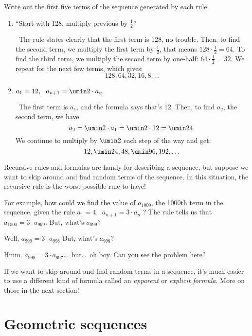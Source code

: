 \begin{boxex}
Write out the first five terms of the sequence generated by each rule.

\begin{enumerate}
\item ``Start with 128, multiply previous by $\frac{1}{2}$''

\exsoln\ The rule states clearly that the first term is 128, no trouble. Then, to find the second term, we multiply the first term by $\frac{1}{2}$, that means $128 \cdot \frac{1}{2} = 64$. To find the third term, we multiply the second term by one-half: $64 \cdot \frac{1}{2} = 32$. We repeat for the next few terms, which gives:\[128, 64, 32, 16, 8, \dotsc\]

\item $a_1 = 12, ~~ a_{n+1} = \umin2\cdot a_n$

\exsoln\ The first term is $a_1$, and the formula says that's 12. Then, to find $a_2$, the second term, we have \[a_2 = \umin2 \cdot a_1 = \umin2 \cdot 12 = \umin24.\] We continue to multiply by $\umin2$ each step of the way and get:\[12, \umin24, 48, \umin96, 192, \dotsc\]
\end{enumerate}
\end{boxex}

Recursive rules and formulas are handy for describing a sequence, but suppose we want to skip around and find random terms of the sequence. In this situation, the recursive rule is the worst possible rule to have!

For example, how could we find the value of $a_{1000}$, the 1000th term in the sequence, given the rule $a_1 = 4, ~~ a_{n+1} = 3 \cdot a_n$ ? The rule tells us that $a_{1000} = 3 \cdot a_{999}$. But, what's $a_{999}$?

Well, $a_{999} = 3 \cdot a_{998}$ But, what's $a_{998}$?

Hmm. $a_{998} = 3 \cdot a_{997}$\ldots\ but\ldots\ oh boy. Can you see the problem here?

If we want to skip around and find random terms in a sequence, it's much easier to use a different kind of formula called an \textit{apparent} or \textit{explicit formula}. More on those in the next section!


\section{Geometric sequences}
\label{sec:geometricseq}

